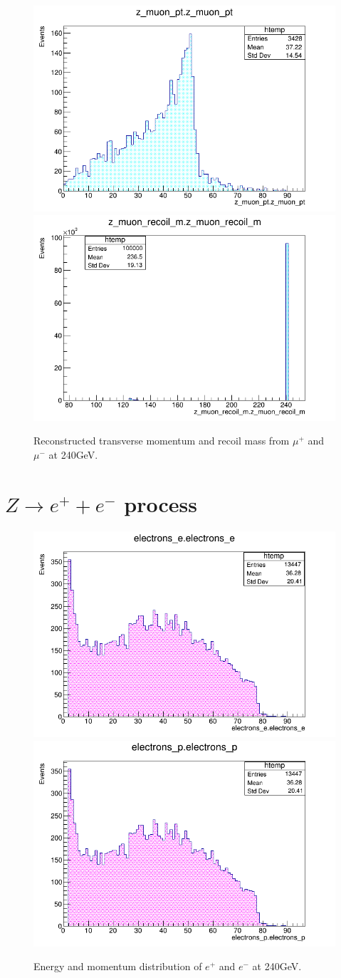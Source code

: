 \begin{figure}[ht!]
    \centering
    \includegraphics[width=0.5\linewidth]{plots/plots/zmu_pt.png}\hfill
    \includegraphics[width=0.5\linewidth]{plots/plots/zmu_recoil_m.png}
    \caption{Reconstructed transverse momentum and recoil mass  from  $\mu^{+}$ and $\mu^{-}$ at 240GeV.}
\end{figure}



\section{$Z\longrightarrow e^{+} + e^{-}$ process}



\begin{figure}[ht!]
    \centering
    \includegraphics[width=0.5\linewidth]{plots/plots/ee.png}\hfill
    \includegraphics[width=0.5\linewidth]{plots/plots/ep.png}
    \caption{Energy and momentum distribution of $e^{+}$ and $e^{-}$ at 240GeV.}   
\end{figure}

